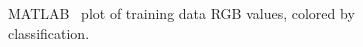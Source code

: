 \documentclass[twoside]{IEEEtran}
\begin{document}
\begin{figure}[!b]
    \hfill
    \hfill
    \caption{MATLAB~\cite{matlab} plot of training data RGB values, colored by classification.}%
    \label{rgb_data}
\end{figure}
\end{document}

